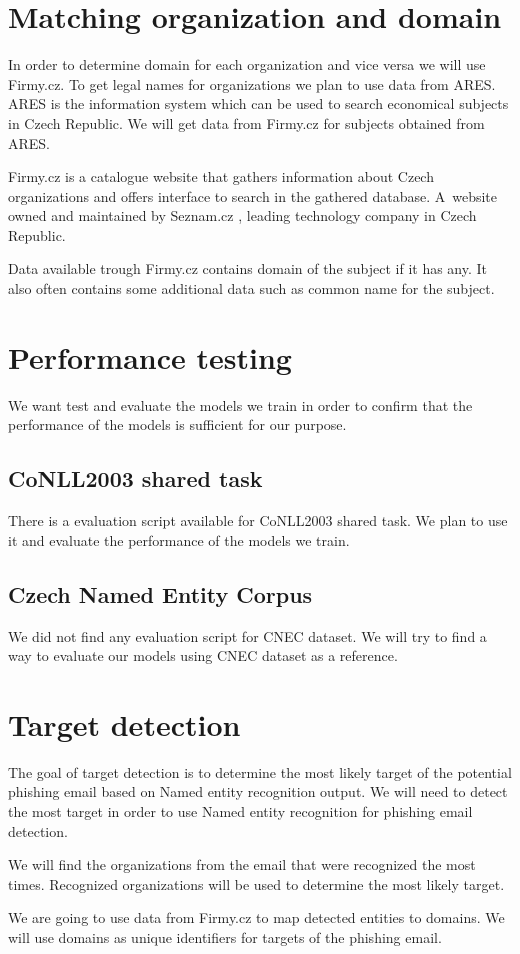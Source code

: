 \documentclass[thesis=B,english]{FITthesis}[2012/10/20]
\begin{document}
\section{Matching organization and domain}
In order to determine domain for each organization and vice versa we will use Firmy.cz. To get legal names for organizations we plan to use data from ARES. ARES is the information system which can be used to search economical subjects in Czech Republic. We will get data from Firmy.cz \cite{firmycz} for subjects obtained from ARES. 
\par Firmy.cz is a catalogue website that gathers information about Czech organizations and offers interface to search in the gathered database. A~website owned and maintained by Seznam.cz \cite{seznamcz}, leading technology company in Czech Republic.

\par Data available trough Firmy.cz contains domain of the subject if it has any. It also often contains some additional data such as common name for the subject.


\section{Performance testing}
We want test and evaluate the models we train in order to confirm that the performance of the models is sufficient for our purpose.
\subsection{CoNLL2003 shared task}
\par There is a evaluation script available for CoNLL2003 shared task. We plan to use it and evaluate the performance of the models we train.
\subsection{Czech Named Entity Corpus}
\par We did not find any evaluation script for CNEC dataset. We will try to find a way to evaluate our models using CNEC dataset as a reference.

\section{Target detection}
The goal of target detection is to determine the most likely target of the potential phishing email based on Named entity recognition output. We will need to detect the most target in order to use Named entity recognition for phishing email detection.
\par We will find the organizations from the email that were recognized the most times. Recognized organizations will be used to determine the most likely target.
\par We are going to use data from Firmy.cz to map detected entities to domains. We will use domains as unique identifiers for targets of the phishing email.
\end{document}
